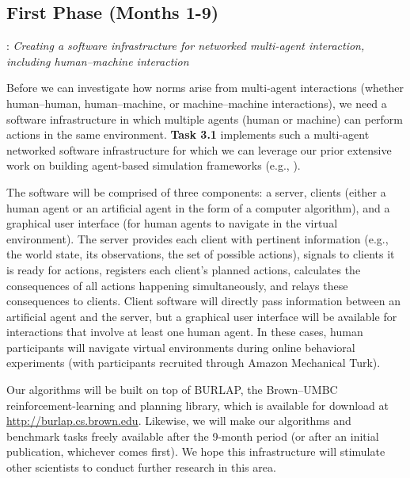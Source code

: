 \documentclass[12pt]{article}
\begin{document}

\subsection*{First Phase (Months 1-9)}


: {\em Creating a software infrastructure for
  networked multi-agent interaction, including human--machine
  interaction } 

\vskip 0.05in 
\noindent Before we can investigate how norms arise from
multi-agent interactions (whether human--human, human--machine, or
machine--machine interactions), we need a software infrastructure in
which multiple agents (human or machine) can perform actions in the
same environment. {\bf Task 3.1} implements such a multi-agent
networked software infrastructure for which we can leverage our prior
extensive work on building agent-based simulation frameworks (e.g.,
\citep{scheutzharris11swages}).

The software will be comprised of three components: a server, clients
(either a human agent or an artificial agent in the form of a computer
algorithm), and a graphical user interface (for human agents to
navigate in the virtual environment). The server provides each client
with pertinent information (e.g., the world state, its observations,
the set of possible actions), signals to clients it is ready for
actions, registers each client's planned actions, calculates the
consequences of all actions happening simultaneously, and relays these
consequences to clients.  Client software will directly pass
information between an artificial agent and the server, but a
graphical user interface will be available for interactions that
involve at least one human agent.  In these cases, human participants
will navigate virtual environments during online behavioral
experiments (with participants recruited through Amazon Mechanical
Turk).

Our algorithms will be built on top of BURLAP, the Brown--UMBC
reinforcement-learning and planning library, which is available for
download at {\small \url{http://burlap.cs.brown.edu}}.  Likewise, we
will make our algorithms and benchmark tasks freely available after
the 9-month period (or after an initial publication, whichever comes
first).  We hope this infrastructure will stimulate other scientists
to conduct further research in this area.
\end{document}
